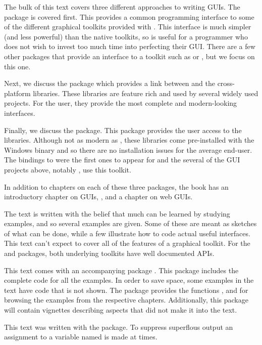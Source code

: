 The bulk of this text covers three different approaches to writing
GUIs. The  package is covered first. This provides a
common programming interface to some of the different graphical
toolkits provided with \R. This interface is much simpler (and less
powerful) than the native toolkits, so is useful for a programmer who
does not wish to invest too much time into perfecting their GUI. There
are a few other packages that provide an \R\/ interface to a toolkit
such as  or , but we focus on this one.


Next, we discuss the  package which provides a link between
\R\/ and the cross-platform \GTK\/ libraries. These libraries are
feature rich and used by several widely used projects. For the \R\/
user, they provide the most complete and modern-looking interfaces.



Finally, we discuss the  package. This package provides the
\R\/ user access to the \TK\/ libraries. Although not as modern as
\GTK, these libraries come pre-installed with the Windows binary and
so there are no installation issues for the average end-user. The bindings
to \TK\/ were the first ones to appear for \R\/ and the several of the
GUI projects above, notably , use this toolkit.

In addition to chapters on each of these three packages, the book has
an introductory chapter on GUIs, , and a chapter on web GUIs.

The text is written with the belief that much can be learned by
studying examples, and so several examples are given. Some of these
are meant as sketches of what can be done, while a few illustrate how
to code actual useful interfaces.  This text can't expect to cover all
of the features of a graphical toolkit. For the  and
 packages, both underlying toolkits have well documented
APIs.


This text comes with an accompanying package \pkg{\PACKAGENAME}. This
package includes the complete code for all the examples. In order to
save space, some examples in the text have code that is not shown. The
package provides the functions ,
 and  for browsing the
examples from the respective chapters. Additionally, this package will
contain vignettes describing aspects that did not make it into the
text.


This text was written with the  package. To suppress
superflous output an assignment to a variable named  is made
at times.
 


